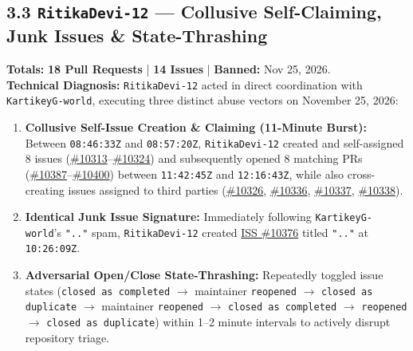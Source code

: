 \documentclass[11pt,a4paper]{article}
\begin{document}
\subsection{3.3 \texttt{RitikaDevi-12} — Collusive Self-Claiming, Junk Issues \& State-Thrashing}
\textbf{Totals:} \textbf{18 Pull Requests} | \textbf{14 Issues} | \textbf{Banned:} Nov 25, 2026.\\
\textbf{Technical Diagnosis:} \texttt{RitikaDevi-12} acted in direct coordination with \texttt{KartikeyG-world}, executing three distinct abuse vectors on November 25, 2026:
\begin{enumerate}[leftmargin=1.5em, itemsep=3pt]
  \item \textbf{Collusive Self-Issue Creation \& Claiming (11-Minute Burst):} Between \texttt{08:46:33Z} and \texttt{08:57:20Z}, \texttt{RitikaDevi-12} created and self-assigned 8 issues (\href{https://github.com/SatyamPandey-07/WorkSphere/issues/10313}{\#10313}--\href{https://github.com/SatyamPandey-07/WorkSphere/issues/10324}{\#10324}) and subsequently opened 8 matching PRs (\href{https://github.com/SatyamPandey-07/WorkSphere/pull/10387}{\#10387}--\href{https://github.com/SatyamPandey-07/WorkSphere/pull/10400}{\#10400}) between \texttt{11:42:45Z} and \texttt{12:16:43Z}, while also cross-creating issues assigned to third parties (\href{https://github.com/SatyamPandey-07/WorkSphere/issues/10326}{\#10326}, \href{https://github.com/SatyamPandey-07/WorkSphere/issues/10336}{\#10336}, \href{https://github.com/SatyamPandey-07/WorkSphere/issues/10337}{\#10337}, \href{https://github.com/SatyamPandey-07/WorkSphere/issues/10338}{\#10338}).
  \item \textbf{Identical Junk Issue Signature:} Immediately following \texttt{KartikeyG-world}'s \texttt{".."} spam, \texttt{RitikaDevi-12} created \href{https://github.com/SatyamPandey-07/WorkSphere/issues/10376}{ISS \#10376} titled \texttt{".."} at \texttt{10:26:09Z}.
  \item \textbf{Adversarial Open/Close State-Thrashing:} Repeatedly toggled issue states (\texttt{closed as completed} $\rightarrow$ maintainer \texttt{reopened} $\rightarrow$ \texttt{closed as duplicate} $\rightarrow$ maintainer \texttt{reopened} $\rightarrow$ \texttt{closed as completed} $\rightarrow$ \texttt{reopened} $\rightarrow$ \texttt{closed as duplicate}) within 1--2 minute intervals to actively disrupt repository triage.
\end{enumerate}
\end{document}
